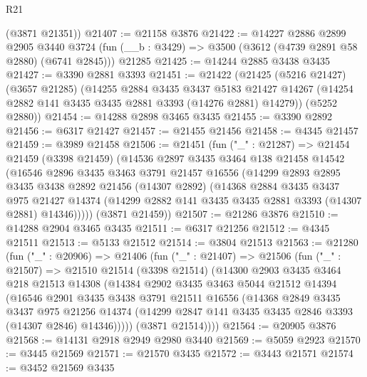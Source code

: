 \begin{lexlean}{R21}
\begin{coremodule}
      (@3871 @21351))
@21407 := @21158 @3876
@21422 := @14227
    @2886
    @2899
    @2905
    @3440
    @3724
    (fun (__b : @3429) => @3500 (@3612 (@4739 @2891 @58 @2880) (@6741 @2845)))
    @21285
@21425 := @14244 @2885 @3438 @3435
@21427 := @3390 @2881 @3393
@21451 := @21422
    (@21425
      (@5216 @21427)
      (@3657 @21285)
      (@14255
        @2884
        @3435
        @3437
        @5183
        @21427
        @14267
        (@14254 @2882 @141 @3435 @3435 @2881 @3393 (@14276 @2881) @14279))
      (@5252 @2880))
@21454 := @14288 @2898 @3465 @3435
@21455 := @3390 @2892
@21456 := @6317 @21427
@21457 := @21455 @21456
@21458 := @4345 @21457
@21459 := @3989 @21458
@21506 := @21451
    (fun ("_" : @21287) =>
    @21454
      @21459
      (@3398 @21459)
      (@14536
        @2897
        @3435
        @3464
        @138
        @21458
        @14542
        (@16546
          @2896
          @3435
          @3463
          @3791
          @21457
          @16556
          (@14299
            @2893
            @2895
            @3435
            @3438
            @2892
            @21456
            (@14307 @2892)
            (@14368
              @2884
              @3435
              @3437
              @975
              @21427
              @14374
              (@14299 @2882 @141 @3435 @3435 @2881 @3393 (@14307 @2881) @14346)))))
      (@3871 @21459))
@21507 := @21286 @3876
@21510 := @14288 @2904 @3465 @3435
@21511 := @6317 @21256
@21512 := @4345 @21511
@21513 := @5133 @21512
@21514 := @3804 @21513
@21563 := @21280
    (fun ("_" : @20906) =>
    @21406
      (fun ("_" : @21407) =>
      @21506
        (fun ("_" : @21507) =>
        @21510
          @21514
          (@3398 @21514)
          (@14300
            @2903
            @3435
            @3464
            @218
            @21513
            @14308
            (@14384
              @2902
              @3435
              @3463
              @5044
              @21512
              @14394
              (@16546
                @2901
                @3435
                @3438
                @3791
                @21511
                @16556
                (@14368
                  @2849
                  @3435
                  @3437
                  @975
                  @21256
                  @14374
                  (@14299 @2847 @141 @3435 @3435 @2846 @3393 (@14307 @2846) @14346)))))
          (@3871 @21514))))
@21564 := @20905 @3876
@21568 := @14131 @2918 @2949 @2980 @3440
@21569 := @5059 @2923
@21570 := @3445 @21569
@21571 := @21570 @3435
@21572 := @3443 @21571
@21574 := @3452 @21569 @3435

\end{coremodule}
\end{lexlean}
